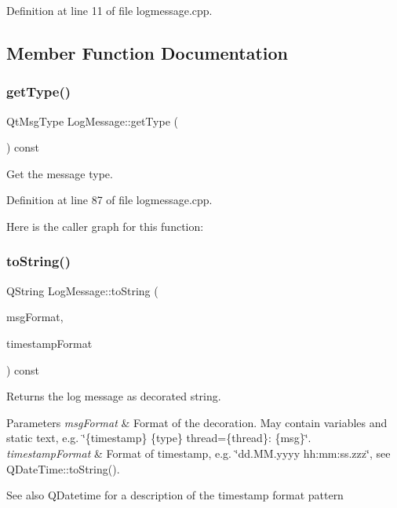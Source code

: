 Definition at line 11 of file logmessage.\+cpp.



\subsection{Member Function Documentation}
\mbox{\label{classstefanfrings_1_1_log_message_a6e0563caa0e118de2b9664b08ee6c856}} 
\subsubsection{\texorpdfstring{get\+Type()}{getType()}}
{\footnotesize\ttfamily Qt\+Msg\+Type Log\+Message\+::get\+Type (\begin{DoxyParamCaption}{ }\end{DoxyParamCaption}) const}

Get the message type. 

Definition at line 87 of file logmessage.\+cpp.

Here is the caller graph for this function\+:
\mbox{\label{classstefanfrings_1_1_log_message_a0afc95ed8eb8b5cc611b5b9436f65053}} 
\subsubsection{\texorpdfstring{to\+String()}{toString()}}
{\footnotesize\ttfamily Q\+String Log\+Message\+::to\+String (\begin{DoxyParamCaption}\item[{const Q\+String \&}]{msg\+Format,  }\item[{const Q\+String \&}]{timestamp\+Format }\end{DoxyParamCaption}) const}

Returns the log message as decorated string. 
\begin{DoxyParams}{Parameters}
{\em msg\+Format} & Format of the decoration. May contain variables and static text, e.\+g. \char`\"{}\{timestamp\} \{type\} thread=\{thread\}\+: \{msg\}\char`\"{}. \\
\hline
{\em timestamp\+Format} & Format of timestamp, e.\+g. \char`\"{}dd.\+M\+M.\+yyyy hh\+:mm\+:ss.\+zzz\char`\"{}, see Q\+Date\+Time\+::to\+String(). \\
\hline
\end{DoxyParams}
\begin{DoxySeeAlso}{See also}
Q\+Datetime for a description of the timestamp format pattern 
\end{DoxySeeAlso}


